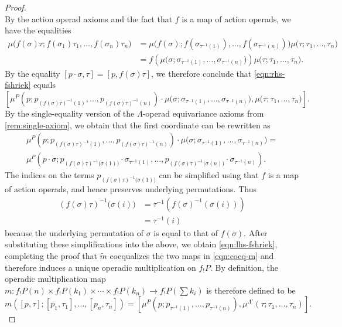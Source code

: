 \begin{proof}
\begin{equation}
\end{equation}
By the action operad axioms and the fact that $f$ is a map of action operads, we have the equalities
\begin{align*}
\mu\big( f(\sigma)\tau; f(\sigma_1)\tau_1, \ldots, f(\sigma_n)\tau_n\big) &= \mu\big( f(\sigma); f(\sigma_{\tau^{-1}(1)}), \ldots, f(\sigma_{\tau^{-1}(n)})\big)\mu\big( \tau; \tau_1, \ldots, \tau_n\big) \\
& = f\left(\mu\big( \sigma; \sigma_{\tau^{-1}(1)}, \ldots, \sigma_{\tau^{-1}(n)}\big) \right)\mu\big( \tau; \tau_1, \ldots, \tau_n\big).
\end{align*}
By the equality $[p\cdot \sigma, \tau] = [p, f(\sigma)\tau]$, we therefore conclude that \cref{eqn:rhs-fshriek} equals
\[
\left[\mu^P(p; p_{(f(\sigma)\tau)^{-1}(1)}, \ldots, p_{(f(\sigma)\tau)^{-1}(n)}) \cdot \mu\big( \sigma; \sigma_{\tau^{-1}(1)}, \ldots, \sigma_{\tau^{-1}(n)}\big), \mu\big( \tau; \tau_1, \ldots, \tau_n\big) \right].
\]
By the single-equality version of the $\Lambda$-operad equivariance axioms from \cref{rem:single-axiom}, we obtain that the first coordinate can be rewritten as
\begin{align*}
\mu^P(p; p_{(f(\sigma)\tau)^{-1}(1)}, \ldots, p_{(f(\sigma)\tau)^{-1}(n)}) \cdot \mu\big( \sigma; \sigma_{\tau^{-1}(1)}, \ldots, \sigma_{\tau^{-1}(n)}\big) = \\
\mu^P(p\cdot \sigma; p_{(f(\sigma)\tau)^{-1}\big( \sigma(1) \big)}\cdot \sigma_{\tau^{-1}(1)}, \ldots, p_{(f(\sigma)\tau)^{-1}\big( \sigma(n) \big)}\cdot \sigma_{\tau^{-1}(n)}). 
\end{align*}
The indices on the terms $p_{(f(\sigma)\tau)^{-1}\big( \sigma(1) \big)}$ can be simplified using that $f$ is a map of action operads, and hence preserves underlying permutations. Thus 
\begin{align*}
(f(\sigma)\tau)^{-1}\big( \sigma(i) \big) & = \tau^{-1}\left( f(\sigma)^{-1}\left( \sigma(i) \right) \right) \\
& = \tau^{-1}(i)
\end{align*}
because the underlying permutation of $\sigma$ is equal to that of $f(\sigma)$. After substituting these simplifications into the above, we obtain \cref{eqn:lhs-fshriek}, completing the proof that $\tilde{m}$ coequalizes the two maps in \cref{eqn:coeq-m} and therefore induces a unique operadic multiplication on $f_{!}P$. By definition, the operadic multiplication map $m \colon f_{!}P(n) \times f_{!}P(k_1) \times \cdots \times f_{!}P(k_n) \to f_{!}P\left( \sum k_i\right)$ is therefore defined to be
\begin{equation}\label{eqn:defn-m}
m\left( [p,\tau]; [p_1, \tau_1], \ldots, [p_n, \tau_n]\right) = \left[ \mu^P(p; p_{\tau^{-1}(1)}, \ldots, p_{\tau^{-1}(n)}), \mu^{\Lambda'}(\tau; \tau_1, \ldots, \tau_n) \right].
\end{equation}


\end{proof}
